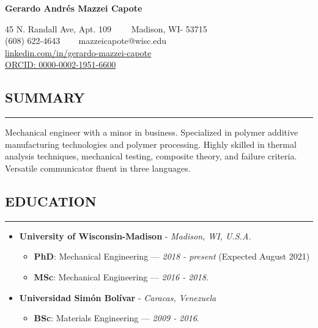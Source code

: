\documentclass[11pt,letterpaper]{article}
\newenvironment{indentsection}[1]%
{\begin{list}{}%
	{\setlength{\leftmargin}{#1}}%
	\item[]%
}
{\end{list}}
\begin{document}
	\thispagestyle{firststyle}

	
\begin{center}
	{\LARGE \textbf{Gerardo Andrés Mazzei Capote}}

	45 N. Randall Ave, Apt. 109\ \ \textbullet
	\ \ Madison, WI- 53715
	\\
	(608) 622-4643 \ \textbullet
	\ \ mazzeicapote@wisc.edu\\
	\href{https://www.linkedin.com/in/gerardo-mazzei-capote}{linkedin.com/in/gerardo-mazzei-capote}\\
	\href{https://orcid.org/0000-0002-1951-6600}{ORCID: 0000-0002-1951-6600}
	
\end{center}

\vspace{-1em}

\subsection*{SUMMARY}
	\vspace{-0.5em}
	\hrule
	\vspace{0.4em}
	\begin{indentsection}{\parindent}
	Mechanical engineer with a minor in business. Specialized in polymer additive manufacturing technologies and polymer processing. Highly skilled in thermal analysis techniques, mechanical testing, composite theory, and failure criteria. Versatile communicator fluent in three languages.
	\end{indentsection}


\subsection*{EDUCATION}
	\vspace{-0.5em}
	\hrule
	\vspace{0.4em}
	\begin{itemize}
	\item
	\textbf{University of Wisconsin-Madison} - \emph{Madison, WI, U.S.A.}
	\begin{itemize}	
	\item
	\textbf{PhD}: Mechanical Engineering --- \emph{2018 - present} (Expected August 2021) 
	\item
	\textbf{MSc}: Mechanical Engineering --- \emph{2016 - 2018}. 
\end{itemize}

	\item
	\textbf{Universidad Simón Bolívar} - \emph{Caracas, Venezuela}
	\begin{itemize}	
		\item
		\textbf{BSc}: Materials Engineering --- \emph{2009 - 2016}. 
	\end{itemize}
	\end{itemize}
\end{document}

